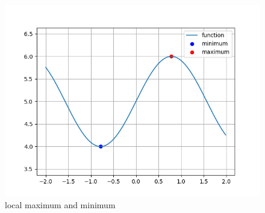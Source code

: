 \documentclass[journal]{IEEEtran}
\begin{document}
\begin{figure}[ht]
    \centering
    \includegraphics[width=\columnwidth]{figs/plot.png}
    \caption{local maximum and minimum}
    \label{fig:Plot1}
    \end{figure}
\end{document}

